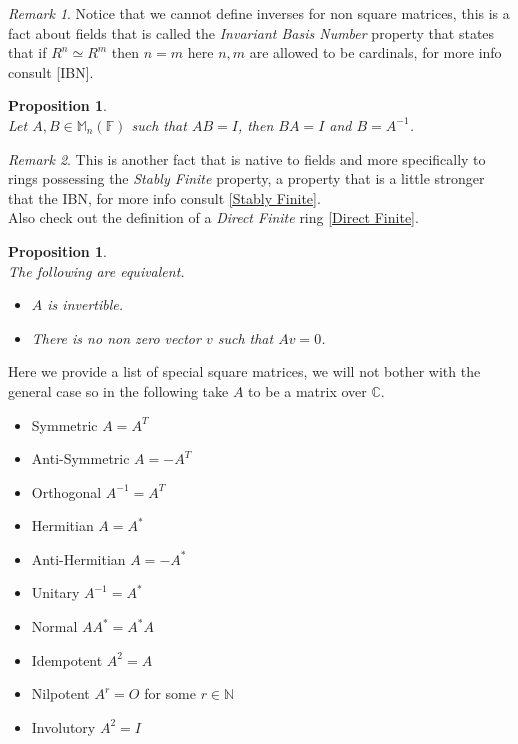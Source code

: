 \documentclass[12pt]{article}
\newtheorem{prop}[theorem]{Proposition}
\theoremstyle{definition}
\theoremstyle{remark}
\newtheorem*{remark}{Remark}
\theoremstyle{plain}
\begin{document}
\begin{remark}
    Notice that we cannot define inverses for non square matrices, this is a fact about fields that is called the \textit{Invariant Basis Number} property that states that if ${R}^n\simeq {R}^m$ then $n=m$ here $n,m$ are allowed to be cardinals, for more info consult [IBN].
\end{remark}
\begin{prop}\leavevmode \\
    Let $A,B\in \mathbb{M}_n(\mathbb{F})$ such that $AB=I$, then $BA=I$ and $B=A^{-1}$.
\end{prop}
\begin{remark}
    This is another fact that is native to fields and more specifically to rings possessing the \textit{Stably Finite} property, a property that is a little stronger that the IBN, for more info consult \href{https://en.wikipedia.org/wiki/Stably_finite_ring}{[Stably Finite]}.\\
    Also check out the definition of a  \textit{Direct Finite} ring \href{https://en.wikipedia.org/wiki/Dedekind-finite_ring}{[Direct Finite]}.
\end{remark}
\begin{prop}\leavevmode \\
       The following are equivalent.
       \begin{itemize}
       	\item $A$ is invertible. 
       	\item There is no non zero vector $v$ such that $Av=0$.
\end{itemize}
\end{prop}

Here we provide a list of special square matrices, we will not bother with the general case so in the following take $A$ to be a matrix over $\mathbb{C}$.
\begin{itemize}
	\item Symmetric $A=A^T$ 
	\item Anti-Symmetric $A=-A^T$ 
	\item Orthogonal $A^{-1}=A^T$ 
	\item Hermitian $A=A^*$ 
	\item Anti-Hermitian $A=-A^*$ 
	\item Unitary $A^{-1}=A^*$ 
	\item Normal $AA^*=A^*A$ 
	\item Idempotent $A^2=A$
	\item Nilpotent $A^r=O$ for some $r\in \mathbb{N}$
	\item Involutory $A^2=I$ 
\end{itemize}
\end{document}
